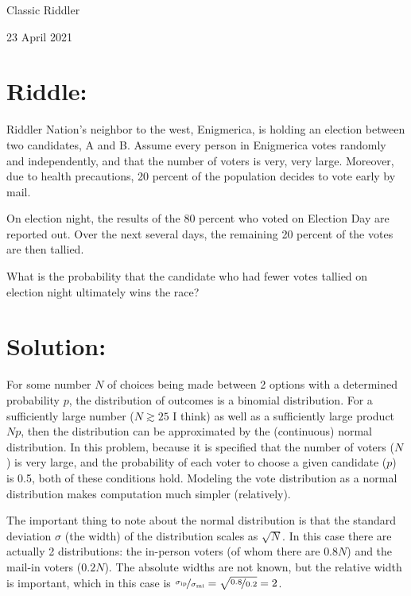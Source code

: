 \documentclass{article}
\begin{document}
\pagestyle{empty} %

\begin{center}
{\LARGE Classic Riddler}

\vspace{0.15in}

{\Large 23 April 2021}
\end{center}


\section*{Riddle:}

Riddler Nation's neighbor to the west, Enigmerica, is holding an election between two candidates, A and B.
Assume every person in Enigmerica votes randomly and independently, and that the number of voters is very, very large.
Moreover, due to health precautions, 20 percent of the population decides to vote early by mail.

On election night, the results of the 80 percent who voted on Election Day are reported out.
Over the next several days, the remaining 20 percent of the votes are then tallied.

What is the probability that the candidate who had fewer votes tallied on election night ultimately wins the race?


\section*{Solution:}

For some number $N$ of choices being made between 2 options with a determined probability $p$, the distribution of outcomes is a binomial distribution.
For a sufficiently large number ($N\gtrsim25$ I think) as well as a sufficiently large product $Np$, then the distribution can be approximated by the (continuous) normal distribution.
In this problem, because it is specified that the number of voters ($N$) is very large, and the probability of each voter to choose a given candidate ($p$) is 0.5, both of these conditions hold.
Modeling the vote distribution as a normal distribution makes computation much simpler (relatively).

The important thing to note about the normal distribution is that the standard deviation $\sigma$ (the width) of the distribution scales as $\sqrt{N}$.
In this case there are actually 2 distributions: the in-person voters (of whom there are $0.8N$) and the mail-in voters ($0.2N$).
The absolute widths are not known, but the relative width is important, which in this case is $\nicefrac{\sigma_{\rm{ip}}}{\sigma_{\rm{mi}}}=\sqrt{\nicefrac{0.8}{0.2}}=2$.
\end{document}
